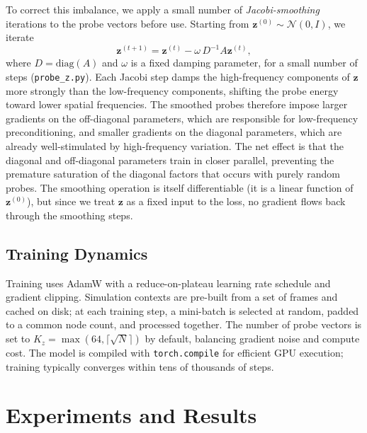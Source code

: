 \documentclass[acmtog,anonymous,review]{acmart}
\begin{document}
To correct this imbalance, we apply a small number of \emph{Jacobi-smoothing} iterations to the
probe vectors before use.  Starting from $\mathbf{z}^{(0)} \sim \mathcal{N}(0, I)$, we iterate
\begin{equation}
  \mathbf{z}^{(t+1)} = \mathbf{z}^{(t)} - \omega \, D^{-1} A \mathbf{z}^{(t)},
  \label{eq:jacobi_smooth}
\end{equation}
where $D = \mathrm{diag}(A)$ and $\omega$ is a fixed damping parameter, for a small number of
steps (\texttt{probe\_z.py}).  Each Jacobi step damps the high-frequency components of
$\mathbf{z}$ more strongly than the low-frequency components, shifting the probe energy toward
lower spatial frequencies.  The smoothed probes therefore impose larger gradients on the
off-diagonal parameters, which are responsible for low-frequency preconditioning, and smaller
gradients on the diagonal parameters, which are already well-stimulated by high-frequency
variation.  The net effect is that the diagonal and off-diagonal parameters train in closer
parallel, preventing the premature saturation of the diagonal factors that occurs with purely
random probes.  The smoothing operation is itself differentiable (it is a linear function of
$\mathbf{z}^{(0)}$), but since we treat $\mathbf{z}$ as a fixed input to the loss, no gradient
flows back through the smoothing steps.

\subsection{Training Dynamics}

Training uses AdamW with a reduce-on-plateau learning rate schedule and gradient clipping.
Simulation contexts are pre-built from a set of frames and cached on disk; at each training step,
a mini-batch is selected at random, padded to a common node count, and processed together.  The
number of probe vectors is set to $K_z = \max(64, \lceil\sqrt{N}\rceil)$ by default, balancing
gradient noise and compute cost.  The model is compiled with \texttt{torch.compile} for efficient
GPU execution; training typically converges within tens of thousands of steps.

\section{Experiments and Results}
\label{sec:results}
\end{document}
